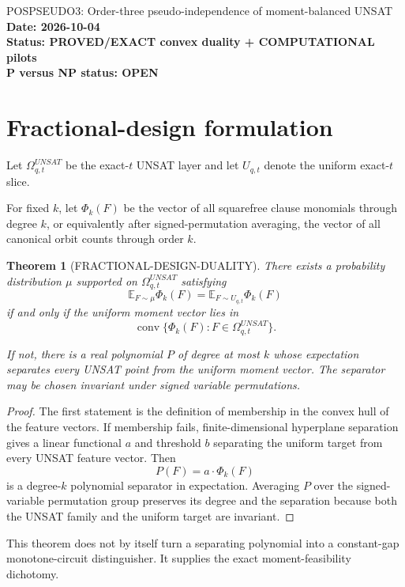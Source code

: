 \documentclass[11pt]{article}
\newtheorem{theorem}{Theorem}
\begin{document}
\begin{center}
{\Large POSPSEUDO3: Order-three pseudo-independence of moment-balanced UNSAT}\\[4pt]
\textbf{Date: 2026-10-04}\\
\textbf{Status: PROVED/EXACT convex duality + COMPUTATIONAL pilots}\\
\textbf{P versus NP status: OPEN}
\end{center}

\section{Fractional-design formulation}

Let \(\Omega_{q,t}^{UNSAT}\) be the exact-\(t\) UNSAT layer and let
\(U_{q,t}\) denote the uniform exact-\(t\) slice.

For fixed \(k\), let \(\Phi_k(F)\) be the vector of all squarefree clause
monomials through degree \(k\), or equivalently after signed-permutation
averaging, the vector of all canonical orbit counts through order \(k\).

\begin{theorem}[FRACTIONAL-DESIGN-DUALITY]
There exists a probability distribution \(\mu\) supported on
\(\Omega_{q,t}^{UNSAT}\) satisfying
\[
\mathbb E_{F\sim\mu}\Phi_k(F)
=
\mathbb E_{F\sim U_{q,t}}\Phi_k(F)
\]
if and only if the uniform moment vector lies in
\[
\operatorname{conv}
\{\Phi_k(F):F\in\Omega_{q,t}^{UNSAT}\}.
\]

If not, there is a real polynomial \(P\) of degree at most \(k\) whose
expectation separates every UNSAT point from the uniform moment vector.
The separator may be chosen invariant under signed variable permutations.
\end{theorem}

\begin{proof}
The first statement is the definition of membership in the convex hull of the
feature vectors.  If membership fails, finite-dimensional hyperplane
separation gives a linear functional \(a\) and threshold \(b\) separating the
uniform target from every UNSAT feature vector.  Then
\[
P(F)=a\cdot\Phi_k(F)
\]
is a degree-\(k\) polynomial separator in expectation.  Averaging \(P\) over
the signed-variable permutation group preserves its degree and the separation
because both the UNSAT family and the uniform target are invariant.
\end{proof}

This theorem does not by itself turn a separating polynomial into a
constant-gap monotone-circuit distinguisher.  It supplies the exact
moment-feasibility dichotomy.
\end{document}
